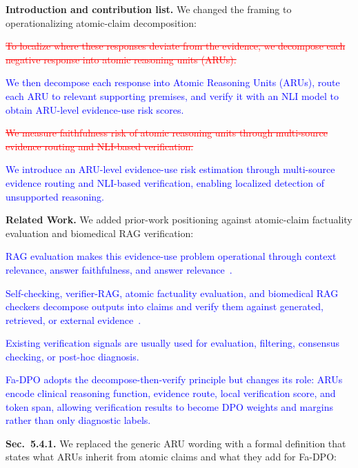 \documentclass[12pt]{article}
\newcommand{\deleted}[1]{\textcolor{red}{\sout{#1}}}
\newcommand{\added}[1]{\textcolor{blue}{#1}}
\begin{document}
\textbf{Introduction and contribution list.} We changed the framing to operationalizing atomic-claim decomposition:

\begin{displayquote}
\deleted{To localize where these responses deviate from the evidence, we decompose each negative response into atomic reasoning units (ARUs).}

\added{We then decompose each response into Atomic Reasoning Units (ARUs), route each ARU to relevant supporting premises, and verify it with an NLI model to obtain ARU-level evidence-use risk scores.}

\deleted{We measure faithfulness risk of atomic reasoning units through multi-source evidence routing and NLI-based verification.}

\added{We introduce an ARU-level evidence-use risk estimation through multi-source evidence routing and NLI-based verification, enabling localized detection of unsupported reasoning.}
\end{displayquote}

\textbf{Related Work.} We added prior-work positioning against atomic-claim factuality evaluation and biomedical RAG verification:

\begin{displayquote}
\added{RAG evaluation makes this evidence-use problem operational through context relevance, answer faithfulness, and answer relevance~\cite{saadfalcon2024ares}.}

\added{Self-checking, verifier-RAG, atomic factuality evaluation, and biomedical RAG checkers decompose outputs into claims and verify them against generated, retrieved, or external evidence~\cite{manakul2023selfcheckgpt, phasook2025vereafine, min-etal-2023-factscore, wei2024longform, song-etal-2024-veriscore, ji2026medragchecker}.}

\added{Existing verification signals are usually used for evaluation, filtering, consensus checking, or post-hoc diagnosis.}

\added{Fa-DPO adopts the decompose-then-verify principle but changes its role: ARUs encode clinical reasoning function, evidence route, local verification score, and token span, allowing verification results to become DPO weights and margins rather than only diagnostic labels.}
\end{displayquote}

\textbf{Sec.~5.4.1.} We replaced the generic ARU wording with a formal definition that states what ARUs inherit from atomic claims and what they add for Fa-DPO:
\end{document}
